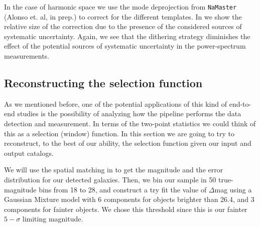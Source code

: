 \documentclass[\docopts]{\docclass}
\begin{document}
In the case of harmonic space we use the mode deprojection from \texttt{NaMaster} (Alonso et. al, in prep.) to correct for the different templates. In  we show the relative size of the correction due to the presence of the considered sources of systematic uncertainty. Again, we see that the dithering strategy diminishes the effect of the potential sources of systematic uncertainty in the power-spectrum measurements.





\subsection{Reconstructing the selection function}

As we mentioned before, one of the potential applications of this kind of end-to-end studies is the possibility of analyzing how the pipeline performs the data detection and measurement. In terms of the two-point statistics we could think of this as a selection (window) function. In this section we are going to try to reconstruct, to the best of our ability, the selection function given our input and output catalogs.

We will use the spatial matching in  to get the magnitude and the error distribution for our detected galaxies. Then, we bin our sample in 50 true-magnitude bins from 18 to 28, and construct a try fit the value of $\Delta$mag using a Gaussian Mixture model with 6 components for objects brighter than 26.4, and 3 components for fainter objects. We chose this threshold since this is our fainter $5-\sigma$ limiting magnitude.
\end{document}
